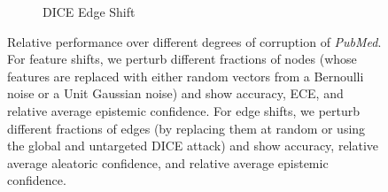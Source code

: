 \begin{figure}
\begin{subfigure}{\textwidth}
        \caption{DICE \citep{Waniek2018} Edge Shift}
    \end{subfigure}
    \caption{Relative performance over different degrees of corruption of \emph{PubMed}. For feature shifts, we perturb different fractions of nodes (whose features are replaced with either random vectors from a Bernoulli noise or a Unit Gaussian noise) and show accuracy, ECE, and relative average epistemic confidence. For edge shifts, we perturb different fractions of edges (by replacing them at random or using the global and untargeted DICE \citep{Waniek2018} attack) and show accuracy, relative average aleatoric confidence, and relative average epistemic confidence.}
    \label{fig:shift-pubmed}
\end{figure}